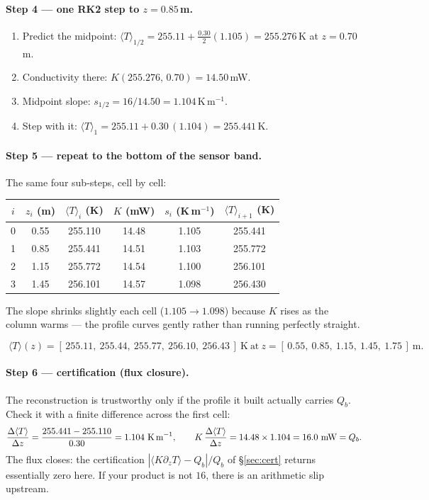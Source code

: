 \documentclass[11pt]{report}
\newcommand{\Tm}{\langle T\rangle}
\begin{document}
\paragraph{Step 4 --- one RK2 step to $z=0.85$\,m.}
\begin{enumerate}[label=(\roman*),leftmargin=2.2em,itemsep=1pt]
\item Predict the midpoint: $\Tm_{1/2}=255.11+\tfrac{0.30}{2}(1.105)=255.276$\,K at $z=0.70$\,m.
\item Conductivity there: $K(255.276,\,0.70)=14.50$\,mW.
\item Midpoint slope: $s_{1/2}=16/14.50=1.104$\,K\,m$^{-1}$.
\item Step with it: $\Tm_1=255.11+0.30\,(1.104)=255.441$\,K.
\end{enumerate}

\paragraph{Step 5 --- repeat to the bottom of the sensor band.}
The same four sub-steps, cell by cell:
\begin{center}\small
\begin{tabular}{@{}cccccc@{}}
\toprule
$i$ & $z_i$ (m) & $\Tm_i$ (K) & $K$ (mW) & $s_i$ (K\,m$^{-1}$) & $\Tm_{i+1}$ (K) \\
\midrule
0 & 0.55 & 255.110 & 14.48 & 1.105 & 255.441 \\
1 & 0.85 & 255.441 & 14.51 & 1.103 & 255.772 \\
2 & 1.15 & 255.772 & 14.54 & 1.100 & 256.101 \\
3 & 1.45 & 256.101 & 14.57 & 1.098 & 256.430 \\
\bottomrule
\end{tabular}
\end{center}
\noindent The slope shrinks slightly each cell ($1.105\to1.098$) because $K$ rises as
the column warms --- the profile curves gently rather than running perfectly straight.

\begin{keypt}[title={Answer (a)}]
\[
\boxed{\;\Tm(z)=[\,255.11,\ 255.44,\ 255.77,\ 256.10,\ 256.43\,]\ \text{K}\ \text{at}\
z=[\,0.55,\ 0.85,\ 1.15,\ 1.45,\ 1.75\,]\ \text{m}.\;}
\]
\end{keypt}

\paragraph{Step 6 --- certification (flux closure).}
The reconstruction is trustworthy only if the profile it built actually carries
$Q_b$. Check it with a finite difference across the first cell:
\[
\frac{\Delta\Tm}{\Delta z}=\frac{255.441-255.110}{0.30}=1.104\ \text{K\,m}^{-1},
\qquad
K\,\frac{\Delta\Tm}{\Delta z}=14.48\times1.104=16.0\ \text{mW}=Q_b .
\]
The flux closes: the certification $|\langle K\partial_z T\rangle-Q_b|/Q_b$ of
\S\ref{sec:cert} returns essentially zero here. If your product is not $16$, there is
an arithmetic slip upstream.
\end{document}
